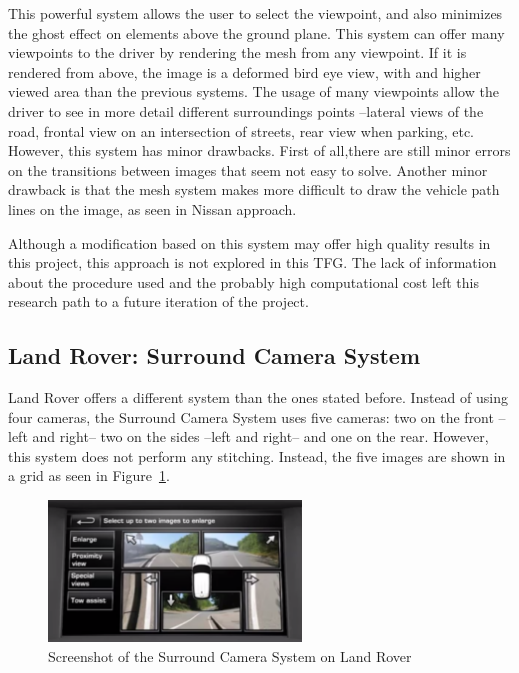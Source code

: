 This powerful system allows the user to select the viewpoint, and also minimizes the ghost effect on elements above the ground plane. This system can offer many viewpoints to the driver by rendering the mesh from any viewpoint. If it is rendered from above, the image is a deformed bird eye view, with and higher viewed area than the previous systems. The usage of many viewpoints allow the driver to see in more detail different surroundings points --lateral views of the road, frontal view on an intersection of streets, rear view when parking, etc. However, this system has minor drawbacks. First of all,there are still minor errors on the transitions between images that seem not easy to solve. Another minor drawback is that the mesh system makes more difficult to draw the vehicle path lines on the image, as seen in Nissan approach.

Although a modification based on this system may offer high quality results in this project, this approach is not explored in this TFG. The lack of information about the procedure used and the probably high computational cost left this research path to a future iteration of the project.

\subsection{Land Rover: Surround Camera System}\label{ssec:land_commerc_state}
Land Rover offers a different system than the ones stated before. Instead of using four cameras, the Surround Camera System 	uses five cameras: two on the front --left and right-- two on the sides --left and right-- and one on the rear. However, this system does not perform any stitching. Instead, the five images are shown in a grid as seen in Figure~\ref{fig:landrover-state}.  \cite{landrover}

\begin{figure}[h]
\center
\includegraphics[width=0.6\textwidth]{images/landrover-state}
		\caption{Screenshot of the Surround Camera System on Land Rover \cite{videolandrover}}
		\label{fig:landrover-state}
\end{figure}

